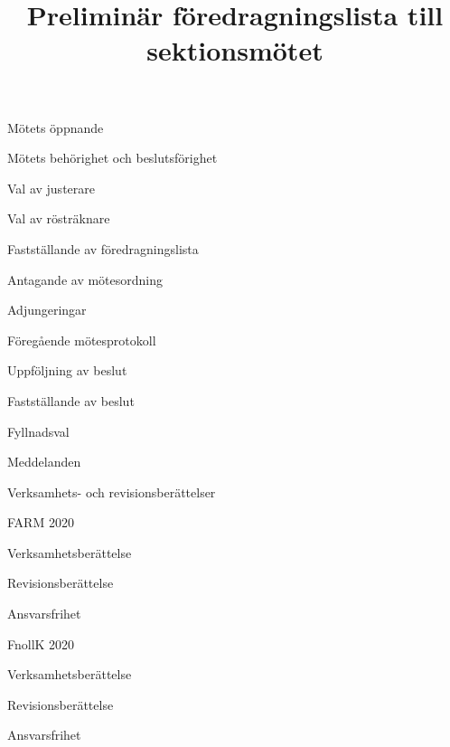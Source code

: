 \documentclass{sektionsmote}
\title{Preliminär föredragningslista till sektionsmötet}
\begin{document}
\maketitle

\begin{ootd}

\item{Mötets öppnande}

\item{Mötets behörighet och beslutsförighet}

\item{Val av justerare}

\item{Val av rösträknare}

\item{Fastställande av föredragningslista}

\item{Antagande av mötesordning}

\item{Adjungeringar}

\item{Föregående mötesprotokoll}

\item{Uppföljning av beslut}

\item{Fastställande av beslut}
\begin{ootd}
    \item Fyllnadsval
\end{ootd}

\item{Meddelanden}

\item{Verksamhets- och revisionsberättelser}
\begin{ootd}
    \item FARM 2020
    \begin{ootd}
        \item Verksamhetsberättelse
        \item Revisionsberättelse
        \item Ansvarsfrihet
    \end{ootd}
    \item FnollK 2020
    \begin{ootd}
        \item Verksamhetsberättelse
        \item Revisionsberättelse
        \item Ansvarsfrihet
    \end{ootd}
\end{ootd}


\end{ootd}
\end{document}
